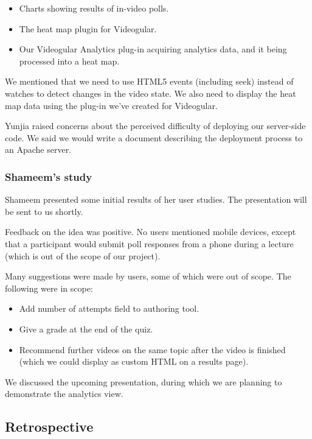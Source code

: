 \begin{itemize}
\itemsep1pt\parskip0pt
\item
  Charts showing results of in-video polls.
\item
  The heat map plugin for Videogular.
\item
  Our Videogular Analytics plug-in acquiring analytics data, and it
  being processed into a heat map.
\end{itemize}

We mentioned that we need to use HTML5 events (including seek) instead
of watches to detect changes in the video state. We also need to display
the heat map data using the plug-in we've created for Videogular.

Yunjia raised concerns about the perceived difficulty of deploying our
server-side code. We said we would write a document describing the
deployment process to an Apache server.

\subsubsection{Shameem's study}

Shameem presented some initial results of her user studies. The
presentation will be sent to us shortly.

Feedback on the idea was positive. No users mentioned mobile devices,
except that a participant would submit poll responses from a phone
during a lecture (which is out of the scope of our project).

Many suggestions were made by users, some of which were out of scope.
The following were in scope:

\begin{itemize}
\itemsep1pt\parskip0pt
\item
  Add number of attempts field to authoring tool.
\item
  Give a grade at the end of the quiz.
\item
  Recommend further videos on the same topic after the video is finished
  (which we could display as custom HTML on a results page).
\end{itemize}

We discussed the upcoming presentation, during which we are planning to
demonstrate the analytics view.

\subsection{Retrospective}

